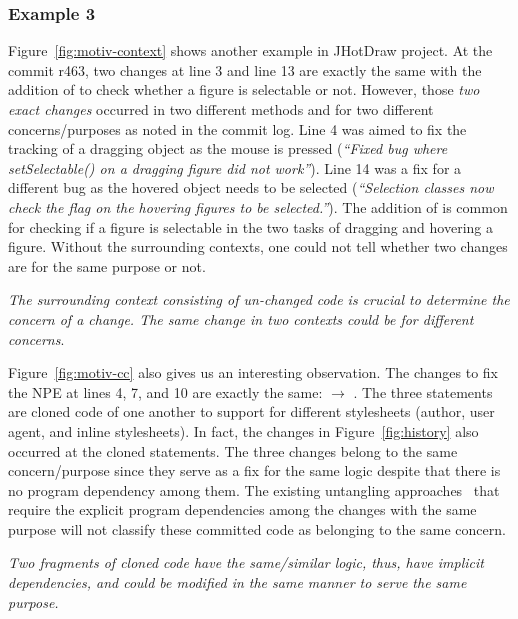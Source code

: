 \subsubsection{Example 3}

Figure~\ref{fig:motiv-context} shows another example in JHotDraw
project. At the commit r463, two changes at line 3 and line 13 are
exactly the same with the addition of  to
check whether a figure is selectable or not. However, those {\em two
  exact changes} occurred in two different methods 
and  for two different concerns/purposes as
noted in the commit log. Line 4 was aimed to fix the tracking of a
dragging object as the mouse is pressed ({\em ``Fixed bug where
  setSelectable() on a dragging figure did not work''}).  Line 14 was
a fix for a different bug as the hovered object needs to be selected
({\em ``Selection classes now check the flag on the hovering figures
  to be selected.''}). The addition of  is
common for checking if a figure is selectable in the two tasks of
dragging and hovering a figure. Without the surrounding contexts,
one could not tell whether two changes are for the same purpose or not.

\vspace{3pt}
 {\em The surrounding context
  consisting of un-changed code is crucial to determine the
  concern of a change. The same change in two 
  contexts could be for different concerns}.

\vspace{3pt}
Figure~\ref{fig:motiv-cc} also gives us an interesting
observation. The changes to fix the NPE at lines 4, 7, and 10 are
exactly the same:  $\rightarrow$
.  The three statements are cloned code
of one another to support for different stylesheets (author, user
agent, and inline stylesheets).  In fact, the changes in
Figure~\ref{fig:history} also occurred at the cloned statements. The
three changes belong to the same concern/purpose since they serve as a
fix for the same logic despite that there is no program dependency
among them. The existing untangling
approaches~\cite{flexeme-fse20,smartcommit-fse21,roover-scam18,barnett-icse15}
that require the explicit program dependencies among the changes with
the same purpose will not classify these committed code as belonging
to the same concern.

\vspace{2pt}
 {\em Two
  fragments of cloned code have the same/similar logic, thus, have
  implicit dependencies, and could be modified in the same manner to
  serve the same purpose.}
